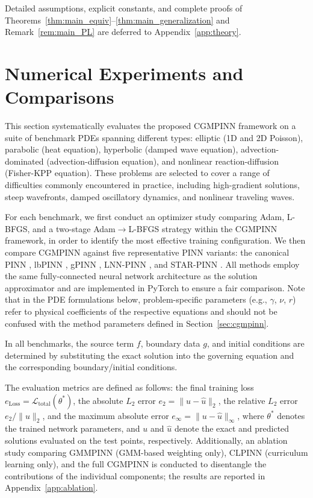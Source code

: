 \documentclass{article}
\theoremstyle{plain}
\theoremstyle{definition}
\theoremstyle{remark}
\begin{document}
Detailed assumptions, explicit constants, and complete proofs of
Theorems~\ref{thm:main_equiv}--\ref{thm:main_generalization} and
Remark~\ref{rem:main_PL} are deferred to Appendix~\ref{app:theory}.



\section{Numerical Experiments and Comparisons}
\label{sec:numerical_experiments}

This section systematically evaluates the proposed CGMPINN framework on a suite of benchmark PDEs spanning different types: elliptic (1D and 2D Poisson), parabolic (heat equation), hyperbolic (damped wave equation), advection-dominated (advection-diffusion equation), and nonlinear reaction-diffusion (Fisher-KPP equation). These problems are selected to cover a range of difficulties commonly encountered in practice, including high-gradient solutions, steep wavefronts, damped oscillatory dynamics, and nonlinear traveling waves.

For each benchmark, we first conduct an optimizer study comparing Adam, L-BFGS, and a two-stage Adam$\to$L-BFGS strategy \cite{Haghighat45} within the CGMPINN framework, in order to identify the most effective training configuration. We then compare CGMPINN against five representative PINN variants: the canonical PINN \cite{PINN_Raissi1}, lbPINN \cite{Xiang26}, gPINN \cite{Yu28}, LNN-PINN \cite{Tao29}, and STAR-PINN \cite{Dodge30}. All methods employ the same fully-connected neural network architecture as the solution approximator and are implemented in PyTorch to ensure a fair comparison.
Note that in the PDE formulations below, problem-specific parameters (e.g., $\gamma$, $\nu$, $r$) refer to physical coefficients of the respective equations and should not be confused with the method parameters defined in Section~\ref{sec:cgmpinn}.

In all benchmarks, the source term $f$, boundary data $g$, and initial conditions are determined by substituting the exact solution into the governing equation and the corresponding boundary/initial conditions.

The evaluation metrics are defined as follows: the final training loss $e_{\text{Loss}} = \mathcal{L}_{\mathrm{total}}(\theta^*)$, the absolute $L_2$ error $e_2 = \|u - \hat{u}\|_2$, the relative $L_2$ error $e_2/\|u\|_2$, and the maximum absolute error $e_\infty = \|u - \hat{u}\|_\infty$, where $\theta^*$ denotes the trained network parameters, and $u$ and $\hat{u}$ denote the exact and predicted solutions evaluated on the test points, respectively. Additionally, an ablation study comparing GMMPINN (GMM-based weighting only), CLPINN (curriculum learning only), and the full CGMPINN is conducted to disentangle the contributions of the individual components; the results are reported in Appendix~\ref{app:ablation}.
\end{document}
